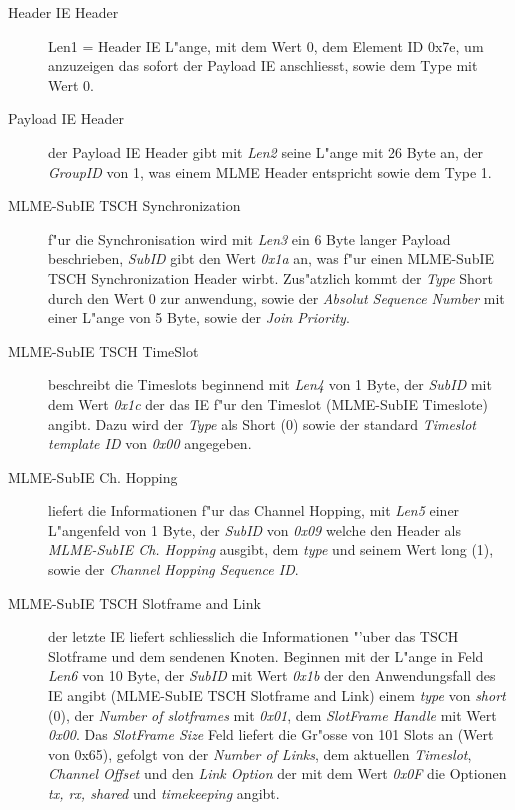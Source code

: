 \begin{description}
  \item[Header IE Header] Len1 = Header IE L"ange, mit dem Wert 0,
  dem Element ID 0x7e, um anzuzeigen das sofort der Payload IE anschliesst,
  sowie dem Type mit Wert 0.
  \item[Payload IE Header] der Payload IE Header gibt mit \textit{Len2} seine
  L"ange mit 26 Byte an, der \textit{GroupID} von 1, was einem MLME Header entspricht
  sowie dem Type 1.
  \item[MLME-SubIE TSCH Synchronization] f"ur die Synchronisation wird mit
  \textit{Len3} ein 6 Byte langer Payload beschrieben, \textit{SubID} gibt
  den Wert \textit{0x1a} an, was f"ur einen MLME-SubIE TSCH Synchronization Header
  wirbt. Zus"atzlich kommt der \textit{Type} Short durch den Wert 0 zur anwendung,
  sowie der \textit{Absolut Sequence Number} mit einer L"ange von 5 Byte, sowie
  der \textit{Join Priority}.
  \item[MLME-SubIE TSCH TimeSlot] beschreibt die Timeslots beginnend mit
  \textit{Len4} von 1 Byte, der \textit{SubID} mit dem Wert \textit{0x1c} der
  das IE f"ur den Timeslot (MLME-SubIE Timeslote) angibt. Dazu wird der \textit{Type}
  als Short (0) sowie der standard \textit{Timeslot template ID} von \textit{0x00}
  angegeben.
  \item[MLME-SubIE Ch. Hopping] liefert die Informationen f"ur das Channel Hopping,
  mit \textit{Len5} einer L"angenfeld von 1 Byte, der \textit{SubID} von \textit{0x09}
  welche den Header als \textit{MLME-SubIE Ch. Hopping} ausgibt, dem \textit{type}
  und seinem Wert long (1), sowie der \textit{Channel Hopping Sequence ID}.
  \item[MLME-SubIE TSCH Slotframe and Link] der letzte IE liefert schliesslich
  die Informationen "'uber das TSCH Slotframe und dem sendenen Knoten.
  Beginnen mit der L"ange in Feld \textit{Len6} von 10 Byte, der \textit{SubID}
  mit Wert \textit{0x1b} der den Anwendungsfall des IE angibt (MLME-SubIE TSCH Slotframe and Link)
  einem \textit{type} von \textit{short} (0), der \textit{Number of slotframes} mit
  \textit{0x01}, dem \textit{SlotFrame Handle} mit Wert \textit{0x00}.
  Das \textit{SlotFrame Size} Feld liefert die Gr"osse von 101 Slots an (Wert von 0x65),
  gefolgt von der \textit{Number of Links}, dem aktuellen \textit{Timeslot},
  \textit{Channel Offset} und den \textit{Link Option} der mit dem Wert \textit{0x0F}
  die Optionen \textit{tx, rx, shared} und \textit{timekeeping} angibt.

\end{description}

